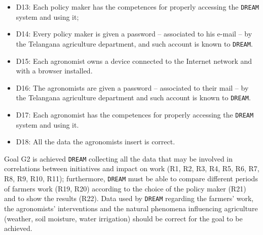 \documentclass{article}
\begin{document}
\begin{itemize}
    \item D13: Each policy maker has the competences for properly accessing the \verb|DREAM| system and using it;
    
    \item D14: Every policy maker is given a password – associated to his e-mail – by the Telangana agriculture department, and such account is known to \verb|DREAM|.
  
    \item D15: Each agronomist owns a device connected to the Internet network and with a browser installed.
  
    \item D16: The agronomists are given a password – associated to their mail – by the Telangana agriculture department and such account is known to \verb|DREAM|.
  
    \item D17: Each agronomist has the competences for properly accessing the \verb|DREAM| system and using it.
   
    \item D18: All the data the agronomists insert is correct.
\end{itemize}

Goal G2 is achieved \verb|DREAM| collecting all the data that may be involved in correlations between initiatives and impact on work (R1, R2, R3, R4, R5, R6, R7, R8, R9, R10, R11); furthermore, \verb|DREAM| must be able to compare different periods of farmers work (R19, R20) according to the choice of the policy maker (R21) and to show the results (R22).
Data used by \verb|DREAM| regarding the farmers' work, the agronomists' interventions and the natural phenomena influencing agriculture (weather, soil moisture, water irrigation) should be correct for the goal to be achieved.

\vspace{5mm}
\end{document}
